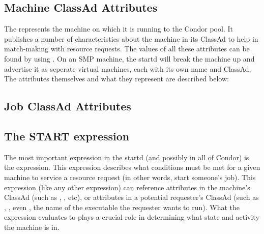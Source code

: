 \subsection{Machine ClassAd Attributes}
\label{sec:Machine-Attributes}

The  represents the machine on which it is running to
the Condor pool.  It publishes a number of characteristics about the
machine in its ClassAd to help in match-making with resource requests.
The values of all these attributes can be found by using
.
On an SMP machine, the startd will break the machine up and advertise
it as seperate virtual machines, each with its own name and ClassAd.
The attributes themselves and what they represent are described below:



\subsection{Job ClassAd Attributes}
\label{sec:Job-Attributes}

\Todo

\subsection{The START expression}
\label{sec:Start-Expr}

The most important expression in the startd (and possibly in all of
Condor) is the  expression.  
This expression describes what conditions must be met for a given
machine to service a resource request (in other words, start someone's
job). 
This expression (like any other expression) can reference attributes
in the machine's ClassAd (such as , ,
etc), or attributes in a potential requester's ClassAd (such as
, , even , the name of the
executable the requester wants to run).
What the  expression evaluates to plays a crucial role in
determining what state and activity the machine is in.

